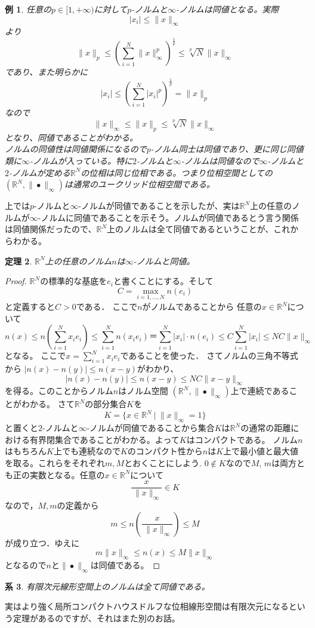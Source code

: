 \documentclass[leqno]{jsarticle}
\newtheorem{thm}{定理}
\newtheorem{cor}[thm]{系}
\newtheorem{exam}[thm]{例}
\newcommand{\rr}{\mathbb{R}}
\newcommand{\mgn}{\infty}
\newcommand{\prn}[1]{\|#1\|_p}
\newcommand{\mrn}[1]{\|#1\|_{\mgn}}
\newcommand{\nor}{n}
\begin{document}

\begin{exam}
任意の$p\in[1,+\mgn)$に対して$p$-ノルムと$\mgn$-ノルムは同値となる。実際
\[
|x_i|\le\mrn{x}
\]
より
\[
\prn{x}\le \left(\sum_{i=1}^N\mrn{x}^p\right)^{\frac{1}{p}}\le \sqrt[p]{N}\mrn{x}
\]
であり、また明らかに
\[
|x_i|\le\left(\sum_{i=1}^N|x_{i}|^p\right)^{\frac{1}{p}}=\prn{x}
\]
なので
\[
\mrn{x}\le\prn{x}\le \sqrt[p]{N}\mrn{x}
\]となり、同値であることがわかる。\\ 
ノルムの同値性は同値関係になるので$p$-ノルム同士は同値であり、更に同じ同値類に$\mgn$-ノルムが入っている。特に$2$-ノルムと$\mgn$-ノルムは同値なので$\mgn$-ノルムと$2$-ノルムが定める$\rr^N$の位相は同じ位相である。つまり位相空間としての$(\rr^N,\mrn{\bullet})$は通常のユークリッド位相空間である。
\end{exam}

上では$p$-ノルムと$\mgn$-ノルムが同値であることを示したが、実は$\rr^N$上の任意のノルムが$\mgn$-ノルムに同値であることを示そう。ノルムが同値であるとう言う関係は同値関係だったので、$\rr^N$上のノルムは全て同値であるということが、これからわかる。

\begin{thm}$\rr^N$上の任意のノルム$\nor$は$\mgn$-ノルムと同値。

\end{thm}

\begin{proof}
$\rr^N$の標準的な基底を$e_i$と書くことにする。そして
\[
C=\max_{i=1, \dots, N} \nor (e_i)
\]
と定義すると$C>0$である．
ここで$\nor$がノルムであることから
任意の$x\in \rr^{N}$について
\[
\nor(x)\le \nor\left(\sum_{i=1}^Nx_i e_{i}\right)
\le \sum_{i=1}^{N}\nor(x_{i} e_{i})
＝ \sum_{i=1}^{N}|x_{i}|\cdot \nor(e_{i})
\le C\sum_{i=1}^N|x_i|\le NC\mrn{x}
\]
となる。
ここで$x=\sum_{i=1}^{N}x_{i}e_{i}$であることを使った．
さてノルムの三角不等式から
$|\nor(x)-\nor(y)|\le \nor(x-y)$がわかり、
\[
|\nor(x)-\nor(y)|\le \nor(x-y)\le NC\mrn{x-y}
\]
を得る。このことからノルム$\nor$はノルム空間
$(\rr^N,\mrn{\bullet})$上で連続であることがわかる。
さて$\rr^N$の部分集合$K$を
\[
K=\{x\in \rr^N\ |\ \mrn{x}=1\}
\]
と置くと$2$-ノルムと$\mgn$-ノルムが同値であることから集合$K$は$\rr^N$の通常の距離における有界閉集合であることがわかる。よって$K$はコンパクトである。
ノルム$\nor$はもちろん$K$上でも連続なので$K$のコンパクト性から$\nor$は$K$上で最小値と最大値を取る。これらをそれぞれ$m, M$とおくことにしよう.
$0\not\in K$なので$M$, $m$は両方とも正の実数となる。任意の$x\in\rr^N$について
\[
\frac{x}{\ \mrn{x}}\in K
\]
なので，$M, m$の定義から
\[
m\le \nor\left(\frac{x}{\ \mrn{x}}\right)\le M
\]
が成り立つ．ゆえに
\[
m\mrn{x}\le \nor(x)\le M\mrn{x}
\]
となるので$\nor$と$\mrn{\bullet}$は同値である。
\end{proof}

\begin{cor}有限次元線形空間上のノルムは全て同値である。

\end{cor}



実はより強く局所コンパクトハウスドルフな位相線形空間は有限次元になるという定理があるのですが、それはまた別のお話。






	

			
\end{document}
